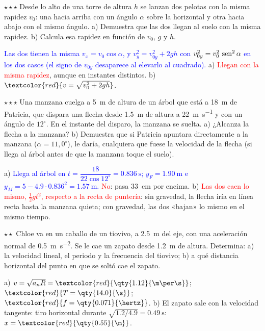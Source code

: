 \begin{exercise}
    \(\star\star\star\) Desde lo alto de una torre de altura \(h\) se lanzan dos pelotas con la misma rapidez \(v_0\): una hacia
    arriba con un ángulo \(\alpha\) sobre la horizontal y otra hacia abajo con el mismo ángulo. a) Demuestra que las dos llegan al
    suelo con la misma rapidez. b) Calcula esa rapidez en función de \(v_0\), \(g\) y \(h\).
    \begin{solu}
        \textcolor{blue}{Las dos tienen la misma \(v_x = v_0\cos\alpha\), y \(v_y^2 = v_{0y}^2 + 2gh\) con \(v_{0y}^2 = v_0^2\,\operatorname{sen}^2\alpha\)
        en los dos casos (el signo de \(v_{0y}\) desaparece al elevarlo al cuadrado).} a) \textcolor{red}{Llegan con la misma
        rapidez}, aunque en instantes distintos. b) \(\textcolor{red}{v = \sqrt{v_0^2 + 2gh}}\).
    \end{solu}
\end{exercise}

\begin{exercise}
    \(\star\star\star\) Una manzana cuelga a \qty{5}{\m} de altura de un árbol que está a \qty{18}{\m} de Patricia, que dispara una
    flecha desde \qty{1.5}{\m} de altura a \qty{22}{\m\per\s} y con un ángulo de \(12^\circ\). En el instante del disparo, la manzana
    se suelta. a) ¿Alcanza la flecha a la manzana? b) Demuestra que si Patricia apuntara directamente a la manzana
    (\(\alpha = 11{,}0^\circ\)), le daría, cualquiera que fuese la velocidad de la flecha (si llega al árbol antes de que la manzana
    toque el suelo).
    \begin{solu}
        a) \textcolor{blue}{Llega al árbol en \(t = \dfrac{18}{22\cos 12^\circ} = \qty{0.836}{\s}\); \(y_F = \qty{1.90}{\m}\) e
        \(y_M = 5 - \num{4.9} \cdot \num{0.836}^2 = \qty{1.57}{\m}\).} \textcolor{red}{No}: pasa \qty{33}{\cm} por encima.
        b) \textcolor{red}{Las dos caen lo mismo, \(\frac{1}{2}gt^2\), respecto a la recta de puntería}: sin gravedad, la flecha iría en
        línea recta hasta la manzana quieta; con gravedad, las dos «bajan» lo mismo en el mismo tiempo.
    \end{solu}
\end{exercise}

\begin{exercise}
    \(\star\star\) Chloe va en un caballo de un tiovivo, a \qty{2.5}{\m} del eje, con una aceleración normal de \qty{0.5}{\m\per\s\squared}.
    Se le cae un zapato desde \qty{1.2}{\m} de altura. Determina: a) la velocidad lineal, el periodo y la frecuencia del tiovivo;
    b) a qué distancia horizontal del punto en que se soltó cae el zapato.
    \begin{solu}
        a) \(v = \sqrt{a_n R} = \textcolor{red}{\qty{1.12}{\m\per\s}}\); \(\textcolor{red}{T = \qty{14.0}{\s}}\);
        \(\textcolor{red}{f = \qty{0.071}{\hertz}}\). b) El zapato sale con la velocidad tangente: tiro horizontal durante
        \(\sqrt{\num{1.2}/\num{4.9}} = \qty{0.49}{\s}\): \(x = \textcolor{red}{\qty{0.55}{\m}}\).
    \end{solu}
\end{exercise}

